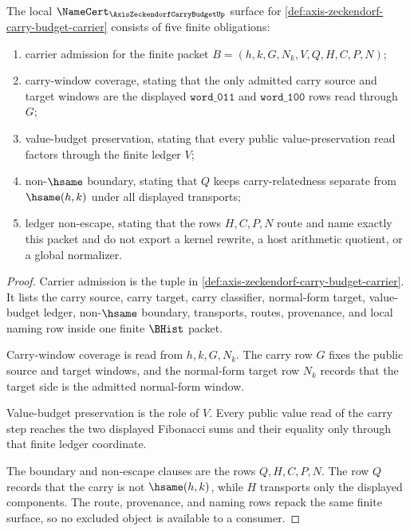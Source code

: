 \begin{theorem}
\label{thm:axis-zeckendorf-carry-budget-namecert-obligations}
The local $\NameCert_{\AxisZeckendorfCarryBudgetUp}$ surface for \autoref{def:axis-zeckendorf-carry-budget-carrier} consists of five finite obligations:
\begin{enumerate}
\item carrier admission for the finite packet $B=(h,k,G,N_k,V,Q,H,C,P,N)$;
\item carry-window coverage, stating that the only admitted carry source and target windows are the displayed $\mathtt{word\_011}$ and $\mathtt{word\_100}$ rows read through $G$;
\item value-budget preservation, stating that every public value-preservation read factors through the finite ledger $V$;
\item non-$\hsame$ boundary, stating that $Q$ keeps carry-relatedness separate from $\hsame(h,k)$ under all displayed transports;
\item ledger non-escape, stating that the rows $H,C,P,N$ route and name exactly this packet and do not export a kernel rewrite, a host arithmetic quotient, or a global normalizer.
\end{enumerate}
\end{theorem}
\begin{proof}
Carrier admission is the tuple in \autoref{def:axis-zeckendorf-carry-budget-carrier}. It lists the carry source, carry target, carry classifier, normal-form target, value-budget ledger, non-$\hsame$ boundary, transports, routes, provenance, and local naming row inside one finite $\BHist$ packet.

Carry-window coverage is read from $h,k,G,N_k$. The carry row $G$ fixes the public source and target windows, and the normal-form target row $N_k$ records that the target side is the admitted normal-form window.

Value-budget preservation is the role of $V$. Every public value read of the carry step reaches the two displayed Fibonacci sums and their equality only through that finite ledger coordinate.

The boundary and non-escape clauses are the rows $Q,H,C,P,N$. The row $Q$ records that the carry is not $\hsame(h,k)$, while $H$ transports only the displayed components. The route, provenance, and naming rows repack the same finite surface, so no excluded object is available to a consumer.
\end{proof}

